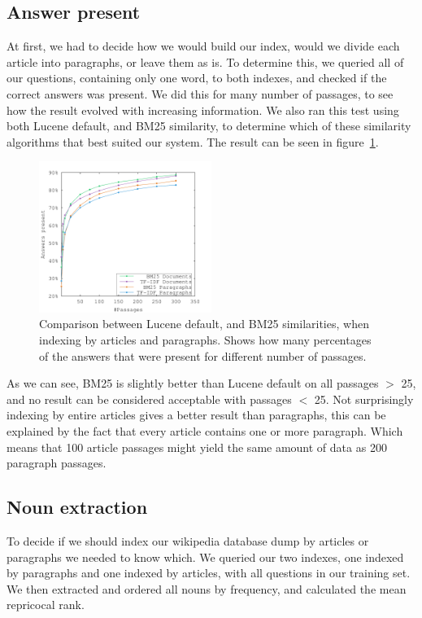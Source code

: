 \subsection{Answer present}
At first, we had to decide how we would build our index, would we divide each article into paragraphs, or leave them as is. 
To determine this, we queried all of our questions, containing only one word, to both indexes, and checked if the correct answers was present.
We did this for many number of passages, to see how the result evolved with increasing information.
We also ran this test using both Lucene default, and BM25 similarity, to determine which of these similarity algorithms that best suited our system.
The result can be seen in figure~\ref{fig:bm25_tfdf}.

\begin{figure}[h!]
  \centering
  \includegraphics[width=0.5\textwidth]{figures/bm25_tfdf.pdf}
  \caption{Comparison between Lucene default, and BM25 similarities, when indexing by articles and paragraphs. 
  Shows how many percentages of the answers that were present for different number of passages.}
  \label{fig:bm25_tfdf}
\end{figure}

As we can see, BM25 is slightly better than Lucene default on all passages $>$ 25, and no result can be considered acceptable with passages $<$ 25.
Not surprisingly indexing by entire articles gives a better result than paragraphs, 
this can be explained by the fact that every article contains one or more paragraph. 
Which means that 100 article passages might yield the same amount of data as 200 paragraph passages.

\subsection{Noun extraction}

To decide if we should index our wikipedia database dump by articles or paragraphs 
we needed to know which. We queried our two indexes, one indexed by paragraphs and
one indexed by articles, with all questions in our training set. We then extracted and 
ordered all nouns by frequency, and calculated the mean repricocal rank.

